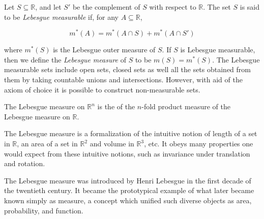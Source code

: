 \documentclass{article}
\begin{document}
Let $S \subseteq \mathbb{R}$, and let $S'$ be the complement of $S$ with respect to $\mathbb{R}$.  The set $S$ is said to be \emph{Lebesgue measurable} if, for any $A \subseteq \mathbb{R}$,

$$m^{*}(A) = m^{*}(A \cap S) + m^{*}(A \cap S')$$

where $m^{*}(S)$ is the Lebesgue outer measure of $S$.  If $S$ is Lebesgue measurable, then we define the \emph{Lebesgue measure} of $S$ to be $m(S) = m^{*}(S)$. The Lebesgue measurable sets include open sets, closed sets as well all the sets obtained from them by taking countable unions and intersections. However, with aid of the axiom of choice it is possible to construct non-measurable sets.

The Lebesgue measure on $\mathbb{R}^n$ is the  of the $n$-fold product measure of the Lebesgue measure on $\mathbb{R}$. 

The Lebesgue measure is a formalization of the intuitive notion of length of a set in $\mathbb{R}$, an area of a set in $\mathbb{R}^2$ and volume in $\mathbb{R}^3$, etc. It obeys many properties one would expect from these intuitive notions, such as invariance under translation and rotation. 

The Lebesgue measure was introduced by Henri Lebesgue in the first decade of the twentieth century. It became the prototypical example of what later became known simply as measure, a concept which unified such diverse objects as area, probability, and function.
\end{document}
